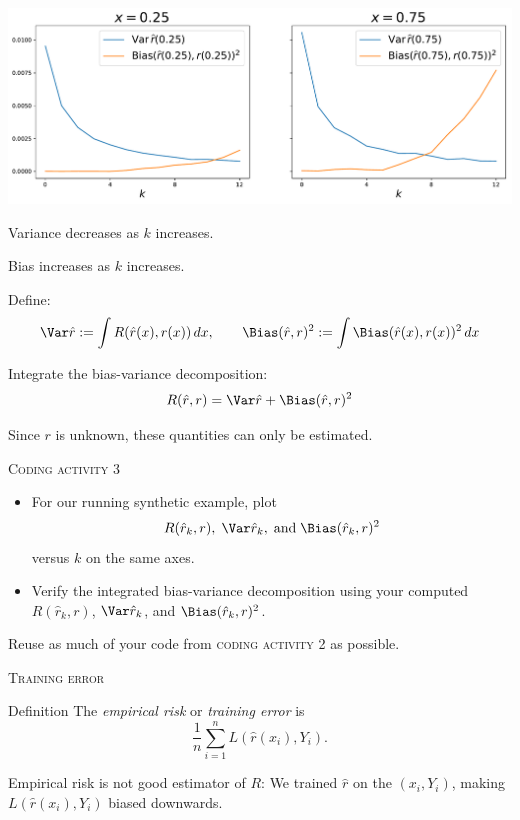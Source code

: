 \documentclass{beamer}
\begin{document}
\begin{frame}{}
    \includegraphics[scale=0.36]{bias_variance.pdf}

    Variance decreases as $k$ increases.

    Bias increases as $k$ increases.
\end{frame}

\begin{frame}{}
    Define:
    \[
        \Var \hat r := \int R(\hat r(x), r(x))\,dx,\qquad \Bias(\hat r, r)^2 := \int\Bias(\hat r(x), r(x))^2\,dx
    \]
    
    Integrate the bias-variance decomposition:
    \[
        R(\hat r, r) = \Var \hat r + \Bias(\hat r, r)^2
    \]

    Since $r$ is unknown, these quantities can only be estimated.
\end{frame}

\begin{frame}{\textsc{Coding activity 3}}
    \begin{itemize}
        \item For our running synthetic example, plot 
        \[
            R(\hat r_k, r),\; \Var \hat r_k,\; \text{and}\; \Bias(\hat r_k, r)^2
        \]
        versus $k$ on the same axes.

        \item Verify the integrated bias-variance decomposition using your computed
        $R(\hat r_k, r)$, $\Var \hat r_k$, and $\Bias(\hat r_k, r)^2$.
    \end{itemize}
     
    Reuse as much of your code from \textsc{coding activity 2} as possible.
\end{frame}

\begin{frame}{\textsc{Training error}}
    \begin{block}{Definition}
        The \emph{empirical risk} or \emph{training error} is
        \[
            \frac1n\sum_{i=1}^n L(\hat r(x_i), Y_i).
        \]
    \end{block}
    Empirical risk is not good estimator of $R$: We trained $\hat r$ on the 
    $(x_i,Y_i)$, making $L(\hat r(x_i), Y_i)$ biased downwards.
\end{frame}
\end{document}
